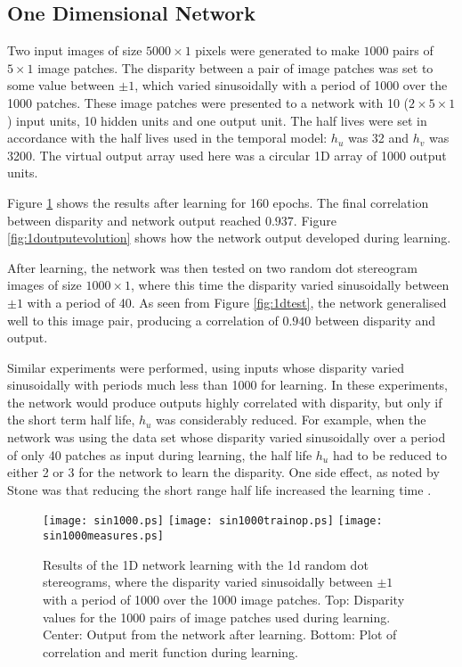 \documentclass[a4paper]{article}
\begin{document}
\subsection{One Dimensional Network}

Two input images of size $5000 \times 1$ pixels were generated to make
$1000$ pairs of $5 \times 1$ image patches.  The disparity between a
pair of image patches was set to some value between $\pm 1$, which
varied sinusoidally with a period of 1000 over the 1000 patches.
These image patches were presented to a network with 10 ($2 \times 5
\times 1$) input units, 10 hidden units and one output unit.  The half
lives were set in accordance with the half lives used in the temporal
model: $h_u$ was 32 and $h_v$ was 3200.  The virtual output array used
here was a circular 1D array of 1000 output units.


Figure \ref{fig:1dtrain} shows the results after learning for
160 epochs.  The final correlation between disparity and network
output reached $0.937$.  Figure \ref{fig:1doutputevolution} shows how
the network output developed during learning.

After learning, the network was then tested on two random dot
stereogram images of size $1000 \times 1 $, where this time the
disparity varied sinusoidally between $\pm 1$ with a period of 40.
As seen from Figure \ref{fig:1dtest}, the network generalised well to
this image pair, producing a correlation of $0.940$ between disparity
and output.



Similar experiments were performed, using inputs whose disparity
varied sinusoidally with periods much less than 1000 for learning.  In
these experiments, the network would produce outputs highly correlated
with disparity, but only if the short term half life, $h_u$ was
considerably reduced.  For example, when the network was using the
data set whose disparity varied sinusoidally over a period of only 40
patches as input during learning, the half life $h_u$ had to be
reduced to either 2 or 3 for the network to learn the disparity.  One
side effect, as noted by Stone was that reducing the short range half
life increased the learning time \cite<see Figure 4 of>{stone94}.


\begin{figure}[htbp]
  \begin{center}

    \texttt{[image: sin1000.ps]}
    \texttt{[image: sin1000trainop.ps]}
    \texttt{[image: sin1000measures.ps]}

    \caption{Results of the 1D network learning with  the 1d random dot
      stereograms, where the disparity varied sinusoidally between
      $\pm 1$ with a period of 1000 over the 1000 image patches.
      Top:  Disparity values for the 1000 pairs of image
      patches used during learning.  Center: Output from the network
      after learning. Bottom:  Plot of correlation and merit function
      during learning.}
    \label{fig:1dtrain}
  \end{center}
\end{figure}
\end{document}
